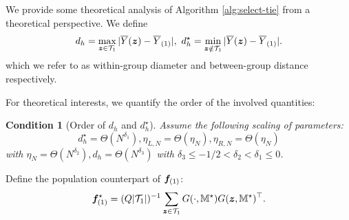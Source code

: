 \documentclass[12pt]{article}
\newtheorem{remark}{Remark}
\newtheorem{condition}{Condition}
\begin{document}
We provide some theoretical analysis of Algorithm \ref{alg:select-tie} from a theoretical perspective. We define
\begin{align*}
    d_h = \max_{{\boldsymbol{z}}\in{\mathcal{T}}_{1} } |\overline{Y}({\boldsymbol{z}}) - \overline{Y}_{(1)}|, ~d^\star_h = \min_{{\boldsymbol{z}}\notin{\mathcal{T}}_{1}} |\overline{Y}({\boldsymbol{z}}) - \overline{Y}_{(1)}|.
\end{align*}
which we refer to as within-group diameter and between-group distance respectively. 

For theoretical interests, we quantify the order of the involved quantities:
\begin{condition}[Order of $d_h$ and $d_h^\star$]\label{cond:distance}
Assume the following scaling of parameters: 
$$
d_h^\star= \Theta(N^{\delta_1}),  \eta_{L,N} = \Theta(\eta_N),  \eta_{R,N} = \Theta(\eta_N)
$$ 
with $\eta_N = \Theta(N^{\delta_2}), d_h = \Theta(N^{\delta_3})$ with $\delta_3 \le -1/2 < \delta_2 < \delta_1 \le 0$.

\end{condition}







Define the population counterpart of ${\boldsymbol{f}}_{(1)}$:
\begin{align*}
    {\boldsymbol{f}}^\star_{(1)}=(Q|{{\mathcal{T}}}_{1}|)^{-1}\sum_{{\boldsymbol{z}}\in {{\mathcal{T}}}_{1}}G(\cdot,{{{\mathbb{M}}}^\star}) G({{\boldsymbol{z}}, {{\mathbb{M}}}^\star})^\top.
\end{align*}
\end{document}
